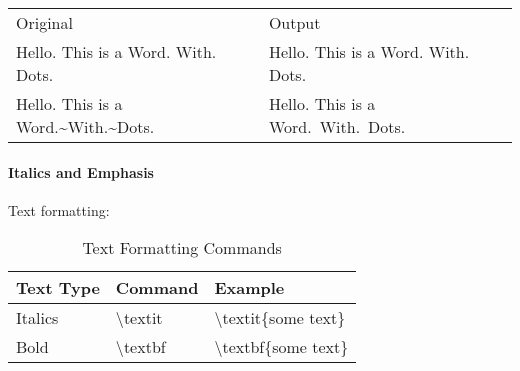 \documentclass{nzlaw}
\newcommand{\s}{\textbackslash}
\begin{document}
\begin{tabular}{l l}
Original & Output \\
Hello. This is a Word. With. Dots. & Hello. This is a Word. With. Dots. \\

Hello. This is a Word.{\textasciitilde}With.{\textasciitilde}Dots. &Hello. This is a Word.~With.~Dots.
\end{tabular}

\paragraph{Italics and Emphasis}
Text formatting:

\begin{table}[H]
\centering
\begin{tabular}{|l|l|l|}
\hline
Text Type & Command & Example \\ \hline
Italics & {\s}textit  & {\s}textit\{some text\}\\
Bold & {\s}textbf  & {\s}textbf\{some text\}\\
\hline
\end{tabular}
\caption{Text Formatting Commands}
\end{table}
\end{document}

